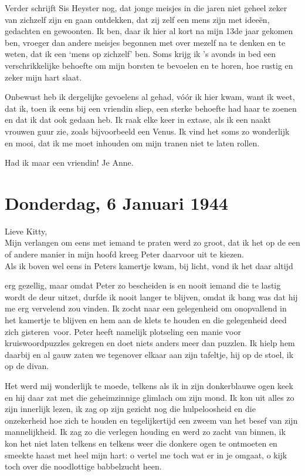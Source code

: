 \documentclass{book}
\begin{document}
Verder schrijft Sis Heyster nog, dat jonge meisjes in die jaren niet geheel
zeker van zichzelf zijn en gaan ontdekken, dat zij zelf een mens zijn met
ideeën, gedachten en gewoonten. Ik ben, daar ik hier al kort na mijn 13de jaar
gekomen ben, vroeger dan andere meisjes begonnen met over mezelf na te denken en
te weten, dat ik een `mens op zichzelf' ben. Soms krijg ik 's avonds in bed een
verschrikkelijke behoefte om mijn borsten te bevoelen en te horen, hoe rustig en
zeker mijn hart slaat.

Onbewust heb ik dergelijke gevoelens al gehad, vóór ik hier kwam, want ik weet,
dat ik, toen ik eens bij een vriendin sliep, een sterke behoefte had haar te
zoenen en dat ik dat ook gedaan heb. Ik raak elke keer in extase, als ik een
naakt vrouwen guur zie, zoals bijvoorbeeld een Venus. Ik vind het soms zo
wonderlijk en mooi, dat ik me moet inhouden om mijn tranen niet te laten rollen.

Had ik maar een vriendin! Je Anne.

\section*{Donderdag, 6 Januari 1944}

Lieve Kitty,\\
Mijn verlangen om eens met iemand te praten werd zo groot, dat ik
het op de een of andere manier in mijn hoofd kreeg Peter daarvoor uit te
kiezen.\\
Als ik boven wel eens in Peters kamertje kwam, bij licht, vond ik het
daar altijd

erg gezellig, maar omdat Peter zo bescheiden is en nooit iemand die te lastig
wordt de deur uitzet, durfde ik nooit langer te blijven, omdat ik bang was dat
hij me erg vervelend zou vinden. Ik zocht naar een gelegenheid om onopvallend in
het kamertje te blijven en hem aan de klets te houden en die gelegenheid deed
zich gisteren~voor. Peter heeft namelijk plotseling een manie voor
kruiswoordpuzzles gekregen en doet niets anders meer dan puzzlen. Ik hielp hem
daarbij en al gauw zaten we tegenover elkaar aan zijn tafeltje, hij op de stoel,
ik op de divan.

Het werd mij wonderlijk te moede, telkens als ik in zijn donkerblauwe ogen keek
en hij daar zat met die geheimzinnige glimlach om zijn mond.  Ik kon uit alles
zo zijn innerlijk lezen, ik zag op zijn gezicht nog die hulpeloosheid en die
onzekerheid hoe zich te houden en tegelijkertijd een zweem van het besef van
zijn mannelijkheid. Ik zag zo die verlegen houding en werd zo zacht van binnen,
ik kon het niet laten telkens en telkens weer die donkere ogen te ontmoeten en
smeekte haast met heel mijn hart: o vertel me toch wat er in je omgaat, o kijk
toch over die noodlottige babbelzucht heen.
\end{document}
